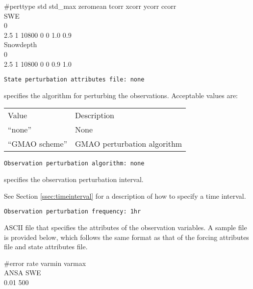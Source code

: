  \#perttype  std    std\_max   zeromean  tcorr  xcorr ycorr ccorr \\
 \indent SWE                                                      \\
     0                                                   \\
    2.5       1        10800   0    0    1.0  0.9     \\
 \indent Snowdepth                                                \\
     0                                                   \\
     2.5       1        10800   0    0    0.9  1.0
 

 \begin{Verbatim}[frame=single]
State perturbation attributes file: none
 \end{Verbatim}

 
  specifies the algorithm
 for perturbing the observations.
 Acceptable values are: 

 \begin{tabular}{ll}
 Value           & Description                 \\
 ``none''        & None                        \\
 ``GMAO scheme'' & GMAO perturbation algorithm \\
 \end{tabular}
 

 \begin{Verbatim}[frame=single]
Observation perturbation algorithm: none
 \end{Verbatim}

 
  specifies the observation
 perturbation interval.

 See Section \ref{ssec:timeinterval} for a description
 of how to specify a time interval.
 

 \begin{Verbatim}[frame=single]
Observation perturbation frequency: 1hr
 \end{Verbatim}

 
  ASCII file that
 specifies the attributes of the observation variables. 
 A sample file is provided below, which follows the same format 
 as that of the forcing attributes file and state attributes file. 

 \#error rate varmin  varmax \\ 
 \indent ANSA SWE                    \\
    0.01   500 
  
